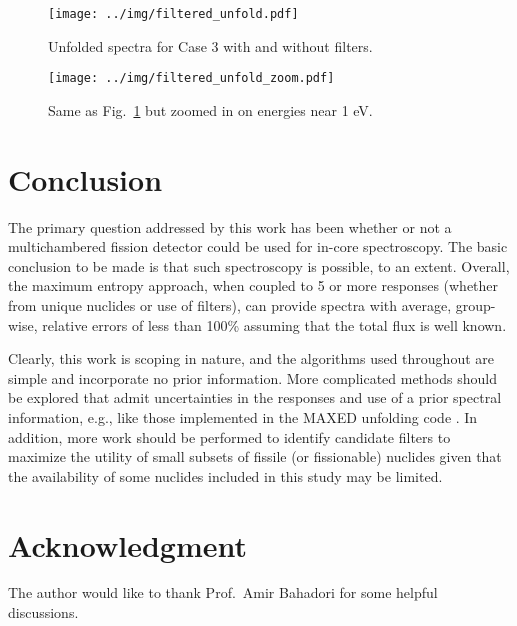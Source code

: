 \documentclass[journal]{IEEEtran}
\newcommand{\FIG}[1]{Fig.~\ref{#1}}               %
\begin{document}
\begin{figure}[h!tb]
  \centering
  \texttt{[image: ../img/filtered\_unfold.pdf]}
  \caption{Unfolded spectra for Case 3 with and without filters.}
  \label{fig:filtered_unfold}
\end{figure}

\begin{figure}[h!tb]
  \centering
  \texttt{[image: ../img/filtered\_unfold\_zoom.pdf]}
  \caption{Same as \FIG{fig:filtered_unfold} but zoomed in on energies near 1 eV.}
  \label{fig:filtered_unfold_zoom}
\end{figure}


\section{Conclusion}

The primary question addressed by this work has been whether or not a multichambered fission detector could be used for in-core spectroscopy.  The basic conclusion to be made is that such spectroscopy is possible, to an extent.  Overall, the maximum entropy approach, when coupled to 5 or more responses (whether from unique nuclides or use of filters), can provide spectra with average, group-wise, relative errors of less than 100\% assuming that the total flux is well known.  

Clearly, this work is scoping in nature, and the algorithms used throughout are simple and incorporate no prior information.  More complicated methods should be explored that admit uncertainties in the responses and use of a prior spectral information, e.g., like those implemented in the MAXED unfolding code \cite{reginatto1999maxed, reginatto2002spectrum}.  In addition, more work should be performed to identify candidate filters to maximize the utility of small subsets of fissile (or fissionable) nuclides given that the availability of some nuclides included in this study may be limited.  



 
\section*{Acknowledgment}


The author would like to thank Prof.~Amir Bahadori for some helpful discussions.


\ifCLASSOPTIONcaptionsoff
  \newpage
\fi
\end{document}
